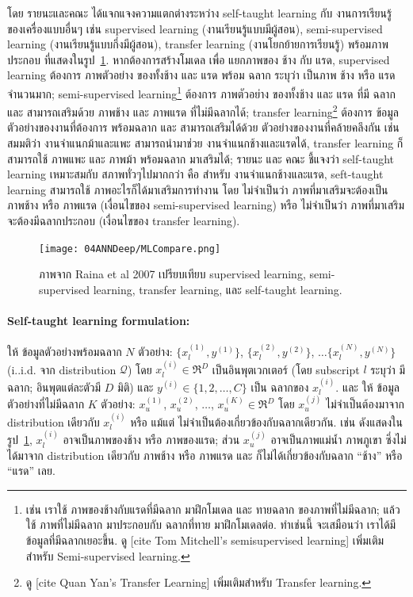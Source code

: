 โดย รายนะและคณะ ได้แจกแจงความแตกต่างระหว่าง self-taught learning กับ งานการเรียนรู้ของเครื่องแบบอื่นๆ เช่น supervised learning (งานเรียนรู้แบบมีผู้สอน), semi-supervised learning (งานเรียนรู้แบบกึ่งมีผู้สอน), transfer learning (งานโยกย้ายการเรียนรู้) พร้อมภาพประกอบ ที่แสดงในรูป~\ref{fig: deep self-taught compares}.
หากต้องการสร้างโมเดล เพื่อ แยกภาพของ ช้าง กับ แรด,
supervised learning ต้องการ ภาพตัวอย่าง ของทั้งช้าง และ แรด พร้อม ฉลาก ระบุว่า เป็นภาพ ช้าง หรือ แรด จำนวนมาก;
semi-supervised learning\footnote{
เช่น เราใช้ ภาพของช้างกับแรดที่มีฉลาก มาฝึกโมเดล และ ทายฉลาก ของภาพที่ไม่มีฉลาก;
แล้ว ใช้ ภาพที่ไม่มีฉลาก มาประกอบกับ ฉลากที่ทาย มาฝึกโมเดลต่อ.
ทำเช่นนี้ จะเสมือนว่า เราได้มีข้อมูลที่มีฉลากเยอะขึ้น.
ดู [cite Tom Mitchell's semisupervised learning] เพิ่มเติมสำหรับ Semi-supervised learning.} 
ต้องการ ภาพตัวอย่าง ของทั้งช้าง และ แรด ที่มี ฉลาก และ สามารถเสริมด้วย ภาพช้าง และ ภาพแรด ที่ไม่มีฉลากได้;
transfer learning\footnote{
ดู [cite Quan Yan's Transfer Learning] เพิ่มเติมสำหรับ Transfer learning.
}
ต้องการ ข้อมูลตัวอย่างของงานที่ต้องการ พร้อมฉลาก และ สามารถเสริมได้ด้วย ตัวอย่างของงานที่คล้ายคลึงกัน
เช่น สมมติว่า งานจำแนกม้าและแพะ สามารถนำมาช่วย งานจำแนกช้างและแรดได้,
transfer learning ก็สามารถใช้ ภาพแพะ และ ภาพม้า พร้อมฉลาก มาเสริมได้;
รายนะ และ คณะ ชี้แจงว่า self-taught learning เหมาะสมกับ สภาพทั่วๆไปมากกว่า คือ สำหรับ งานจำแนกช้างและแรด, seft-taught learning สามารถใช้ ภาพอะไรก็ได้มาเสริมการทำงาน โดย 
ไม่จำเป็นว่า ภาพที่มาเสริมจะต้องเป็น ภาพช้าง หรือ ภาพแรด (เงื่อนไขของ semi-supervised learning)
หรือ
ไม่จำเป็นว่า ภาพที่มาเสริมจะต้องมีฉลากประกอบ (เงื่อนไขของ transfer learning).

%
\begin{figure}
\begin{center}
\texttt{[image: 04ANNDeep/MLCompare.png]}
\end{center}
\caption{ภาพจาก Raina et al 2007 เปรียบเทียบ supervised learning, semi-supervised learning, transfer learning, และ self-taught learning.}
\label{fig: deep self-taught compares}
\end{figure}
%

\paragraph{Self-taught learning formulation:}
ให้ ข้อมูลตัวอย่างพร้อมฉลาก $N$ ตัวอย่าง: $\{ x_l^{(1)}, y^{(1)} \}$, $\{ x_l^{(2)}, y^{(2)} \}$, $\ldots \{ x_l^{(N)}, y^{(N)} \}$ (i..i.d. จาก distribution $\mathcal{Q}$)
โดย $x_l^{(i)} \in \Re^D$ เป็นอินพุตเวกเตอร์ (โดย subscript $l$ ระบุว่า มีฉลาก; อินพุตแต่ละตัวมี $D$ มิติ)
และ $y^{(i)} \in \{ 1, 2, \ldots, C \}$ เป็น ฉลากของ $x_l^{(i)}$.
และ ให้ ข้อมูลตัวอย่างที่ไม่มีฉลาก $K$ ตัวอย่าง: 
$x_u^{(1)}$, $x_u^{(2)}$, $\ldots$, $x_u^{(K)} \in \Re^D$
โดย $x_u^{(j)}$ ไม่จำเป็นต้องมาจาก distribution เดียวกับ $x_l^{(i)}$ หรือ แม้แต่ ไม่จำเป็นต้องเกี่ยวข้องกับฉลากเดียวกัน.
เช่น ดังแสดงในรูป~\ref{fig: deep self-taught compares}, $x_l^{(i)}$ อาจเป็นภาพของช้าง หรือ ภาพของแรด;
ส่วน $x_u^{(j)}$ อาจเป็นภาพแม่น้ำ ภาพภูเขา ซึ่งไม่ได้มาจาก distribution เดียวกับ ภาพช้าง หรือ ภาพแรด และ ก็ไม่ได้เกี่ยวข้องกับฉลาก ``ช้าง'' หรือ ``แรด'' เลย.

